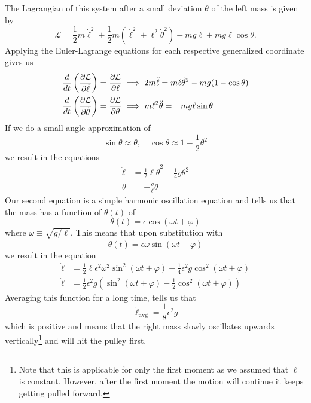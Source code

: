 \documentclass[11pt]{scrartcl}
\begin{document}
\begin{soln}
The Lagrangian of this system after a small deviation $\theta$ of the left mass is given by 
\[\mathcal{L} = \frac{1}{2}m\dot{\ell}^2 + \frac{1}{2}m (\dot\ell^2 + \ell^2\dot\theta^2) - mg\ell + mg\ell\cos\theta.\]
Applying the Euler-Lagrange equations for each respective generalized coordinate gives us
\begin{align*}
    \frac{d}{dt}\left(\pdv{\mathcal{L}}{\dot\ell}\right) &= \pdv{\mathcal{L}}{\ell}\implies 2m\ddot\ell = m\ell\dot\theta^2 - mg(1 - \cos\theta) \\
    \frac{d}{dt}\left(\pdv{\mathcal{L}}{\dot\theta}\right) &= \pdv{\mathcal{L}}{\theta}\implies m\ell^2\ddot{\theta} = -mg\ell\sin\theta
\end{align*}
If we do a  small angle approximation of 
\[\sin\theta \approx \theta, \quad \cos\theta \approx 1 - \frac{1}{2}\theta^2\]
we result in the equations 
\begin{align*}
    \ddot\ell &= \frac{1}{2}\ell\dot\theta^2 - \frac{1}{4}g\theta^2 \\
    \ddot\theta &= -\frac{g}{\ell}\theta
\end{align*}
Our second equation is a simple harmonic oscillation equation and tells us that the mass has a function of $\theta (t)$ of 
\[\theta (t) = \epsilon \cos (\omega t + \varphi)\]
where $\omega \equiv \sqrt{g/\ell}$. This means that upon substitution with 
\[\dot\theta (t) = \epsilon \omega \sin (\omega t + \varphi)\]
we result in the equation 
\begin{align*}
\ddot\ell &= \frac{1}{2}\ell \epsilon^2 \omega^2 \sin^2 (\omega t + \varphi) - \frac{1}{4}\epsilon^2 g\cos^2 (\omega t + \varphi) \\
\ddot \ell &= \frac{1}{2}\epsilon^2 g\left(\sin^2 (\omega t + \varphi) - \frac{1}{2}\cos^2 (\omega t + \varphi)\right)
\end{align*}
Averaging this function for a long time, tells us that 
\[\ddot\ell_{\text{avg}} = \frac{1}{8}\epsilon^2 g\]
which is positive and means that the right mass slowly oscillates upwards vertically\footnote{Note that this is applicable for only the first moment as we assumed that $\ell$ is constant. However, after the first moment the motion will continue it keeps getting pulled forward.} and will hit the pulley first.
\end{soln}
\end{document}
